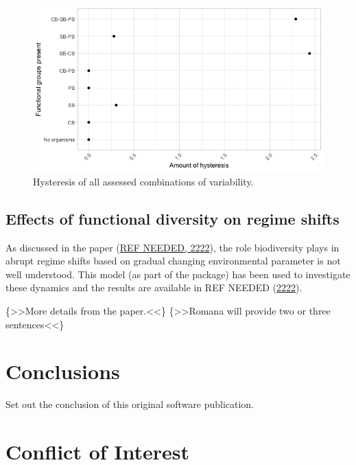 \documentclass[]{elsarticle} %
\begin{document}
\begin{figure}

{\centering \includegraphics[width=500px]{figures/user_guide_hysteresis} 

}

\caption{Hysteresis of all assessed combinations of variability.}\label{fig:user_guide_hysteresis}
\end{figure}

\hypertarget{effects-of-functional-diversity-on-regime-shifts}{%
\subsection{Effects of functional diversity on regime
shifts}\label{effects-of-functional-diversity-on-regime-shifts}}

As discussed in the paper (\protect\hyperlink{ref-REF_NEEDED}{REF
NEEDED, 2222}), the role biodiversity plays in abrupt regime shifts
based on gradual changing environmental parameter is not well
understood. This model (as part of the package) has been used to
investigate these dynamics and the results are available in REF NEEDED
(\protect\hyperlink{ref-REF_NEEDED}{2222}).

{\{\textgreater\textgreater More details from the
paper.\textless\textless\} \{\textgreater\textgreater Romana will
provide two or three sentences\textless\textless\}}

\hypertarget{conclusions}{%
\section{Conclusions}\label{conclusions}}

Set out the conclusion of this original software publication.

\hypertarget{conflict-of-interest}{%
\section{Conflict of Interest}\label{conflict-of-interest}}
\end{document}

